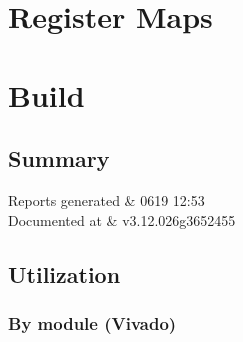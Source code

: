 \documentclass[letterpaper,10pt,english]{sphinxmanual}
\begin{document}
\sphinxstepscope


\chapter{Register Maps}
\label{\detokenize{registers:register-maps}}\label{\detokenize{registers::doc}}
\sphinxstepscope


\chapter{Build}
\label{\detokenize{synthesis/index:build}}\label{\detokenize{synthesis/index::doc}}

\section{Summary}
\label{\detokenize{synthesis/index:summary}}

\begin{savenotes}\sphinxattablestart
\sphinxthistablewithglobalstyle
\centering
\begin{tabular}[t]{}
\sphinxtoprule
\sphinxtableatstartofbodyhook
\sphinxAtStartPar
Reports generated
&
\sphinxhyphen{}06\sphinxhyphen{}19 12:53
\\
\sphinxhline
\sphinxAtStartPar
Documented at
&
\sphinxAtStartPar
v3.12.0\sphinxhyphen{}26\sphinxhyphen{}g3652455
\\
\sphinxbottomrule
\end{tabular}
\sphinxtableafterendhook\par
\sphinxattableend\end{savenotes}


\section{Utilization}
\label{\detokenize{synthesis/index:utilization}}

\subsection{By module (Vivado)}
\label{\detokenize{synthesis/index:by-module-vivado}}
\end{document}
